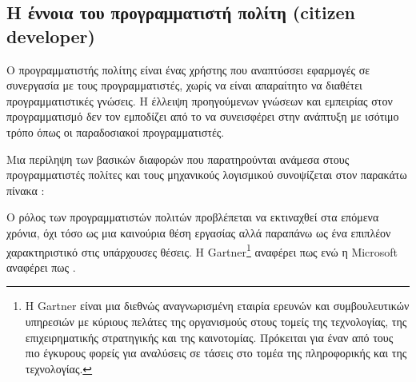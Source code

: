             \subsection{Η έννοια του προγραμματιστή πολίτη (citizen developer)} \label{subsec:citizen-developer}
                Ο προγραμματιστής πολίτης είναι ένας χρήστης που αναπτύσσει εφαρμογές σε συνεργασία με τους προγραμματιστές, χωρίς να είναι απαραίτητο να διαθέτει προγραμματιστικές γνώσεις. Η έλλειψη προηγούμενων γνώσεων και εμπειρίας στον προγραμματισμό δεν τον εμποδίζει από το να συνεισφέρει στην ανάπτυξη με ισότιμο τρόπο όπως οι παραδοσιακοί προγραμματιστές.

                Μια περίληψη των βασικών διαφορών που παρατηρούνται ανάμεσα στους προγραμματιστές πολίτες και τους μηχανικούς λογισμικού συνοψίζεται στον παρακάτω πίνακα \cite{LowCodeSimon}:

                \begin{table}[H] \noindent\centering
                \end{table}

                Ο ρόλος των προγραμματιστών πολιτών προβλέπεται να εκτιναχθεί στα επόμενα χρόνια, όχι τόσο ως μια καινούρια θέση εργασίας αλλά παραπάνω ως ένα επιπλέον χαρακτηριστικό στις υπάρχουσες θέσεις. Η Gartner\footnote{Η Gartner είναι μια διεθνώς αναγνωρισμένη εταιρία ερευνών και συμβουλευτικών υπηρεσιών με κύριους πελάτες της οργανισμούς στους τομείς της τεχνολογίας, της επιχειρηματικής στρατηγικής και της καινοτομίας. Πρόκειται για έναν από τους πιο έγκυρους φορείς για αναλύσεις σε τάσεις στο τομέα της πληροφορικής και της τεχνολογίας.} αναφέρει πως  \cite{GartnerReport} ενώ η Microsoft αναφέρει πως  \cite{cnbcNextFrontier}.

